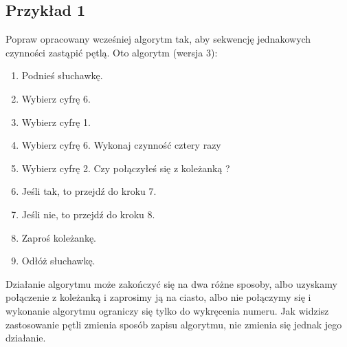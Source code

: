 \documentclass[a4paper,11pt]{article}
\begin{document}
\subsection{Przykład 1}
Popraw opracowany wcześniej algorytm tak, aby sekwencję 
jednakowych czynności zastąpić pętlą. 
Oto algorytm (wersja 3):
\begin{enumerate}
\item Podnieś słuchawkę. 
\item Wybierz cyfrę 6. 
\item Wybierz cyfrę 1. 
\item Wybierz cyfrę 6. 
Wykonaj czynność cztery razy 
\item Wybierz cyfrę 2. 
Czy połączyłeś się z koleżanką ? 
\item Jeśli tak, to przejdź do kroku 7. 
\item Jeśli nie, to przejdź do kroku 8. 
\item Zaproś koleżankę. 
\item Odłóż słuchawkę. 
\end{enumerate}
Działanie algorytmu może zakończyć się na dwa różne sposoby, albo uzyskamy 
połączenie z koleżanką i zaprosimy ją na ciasto, albo nie połączymy się i wykonanie 
algorytmu ograniczy się tylko do wykręcenia numeru. 
Jak widzisz zastosowanie pętli zmienia sposób zapisu algorytmu, nie zmienia się 
jednak jego działanie. 
 
\end{document}
